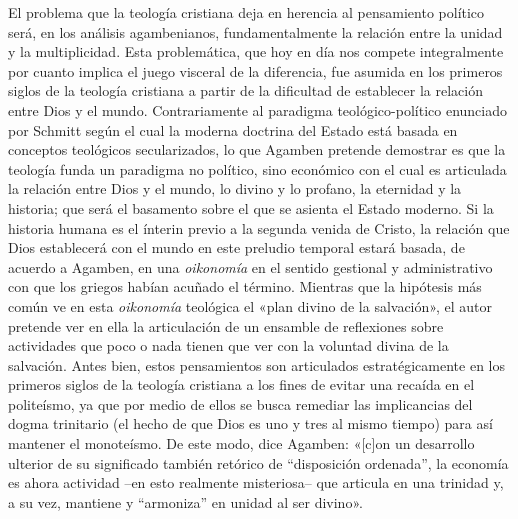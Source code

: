 El problema que la teología cristiana deja en herencia al pensamiento político será, en los análisis agambenianos, fundamentalmente la relación entre la unidad y la multiplicidad. Esta problemática, que hoy en día nos compete integralmente por cuanto implica el juego visceral de la diferencia, fue asumida en los primeros siglos de la teología cristiana a partir de la dificultad de establecer la relación entre Dios y el mundo. Contrariamente al paradigma teológico-político enunciado por Schmitt según el cual la moderna doctrina del Estado está basada en conceptos teológicos secularizados, lo que Agamben pretende demostrar es que la teología funda un paradigma no político, sino económico con el cual es articulada la relación entre Dios y el mundo, lo divino y lo profano, la eternidad y la historia; que será el basamento sobre el que se asienta el Estado moderno. Si la historia humana es el ínterin previo a la segunda venida de Cristo, la relación que Dios establecerá con el mundo en este preludio temporal estará basada, de acuerdo a Agamben, en una \emph{oikonomía }en el sentido gestional y administrativo con que los griegos habían acuñado el término. Mientras que la hipótesis más común ve en esta \emph{oikonomía }teológica el «plan divino de la salvación», el autor pretende ver en ella la articulación de un ensamble de reflexiones sobre actividades que poco o nada tienen que ver con la voluntad divina de la salvación. Antes bien, estos pensamientos son articulados estratégicamente en los primeros siglos de la teología cristiana a los fines de evitar una recaída en el politeísmo, ya que por medio de ellos se busca remediar las implicancias del dogma trinitario (el hecho de que Dios es uno y tres al mismo tiempo) para así mantener el monoteísmo. De este modo, dice Agamben: «{[}c{]}on un desarrollo ulterior de su significado también retórico de ``disposición ordenada'', la economía es ahora actividad --en esto realmente misteriosa-- que articula en una trinidad y, a su vez, mantiene y ``armoniza'' en unidad al ser divino».

